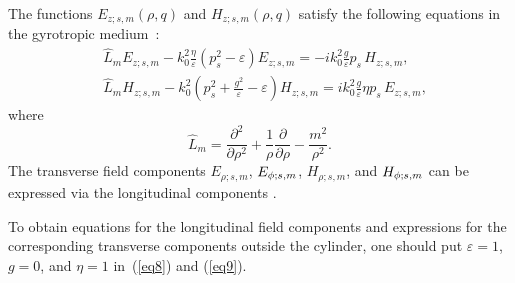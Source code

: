 \documentclass[conference,a4paper]{IEEEtran}
\begin{document}
The functions $E_{z;s,m}(\rho,q)$  and $H_{z;s,m}(\rho,q)$ satisfy the following equations in the gyrotropic medium~\cite{Kondratev1999}:
\begin{align}
&\displaystyle{ {\hat L}_{m}E_{z;s,m}-k_{0}^{2}\frac{\eta}{\varepsilon}\left(p^{2}_s-\varepsilon\right)E_{z;s,m}{=}{-}{i} k^{2}_{0}\frac{g}{\varepsilon} p_s\, H_{z;s,m} },
\label{eq8}\\
& \displaystyle{ {\hat L}_{m}H_{z;s,m}{-}k_{0}^{2}\left(p^{2}_s +\frac{g^2}{\varepsilon}{-}\varepsilon\right)H_{z;s,m}{=}{i} k^{2}_{0}\frac{g}{\varepsilon}\eta p_s\,E_{z;s,m}},\label{eq9}
\end{align}
where
\begin{equation}
\displaystyle{{\hat{L}}_m =\frac{{\partial}^2}{{\partial}\rho^2} + \frac{1}{\rho}\frac{{\partial}}{{\partial}\rho} - \frac{m^2}{\rho^2} }.\nonumber
\end{equation}
The transverse field components  $E_{\rho;s,m}$, $E_{\phi;s,m}$, $H_{\rho;s,m}$, and $H_{\phi;s,m}$ can be expressed via the longitudinal components \cite{Kondratev1999}.

To obtain equations for the longitudinal field components  and expressions for the corresponding transverse components outside the cylinder, one should put $\varepsilon=1$, $g=0$, and $\eta=1$ in~(\ref{eq8}) and (\ref{eq9}).
\end{document}
